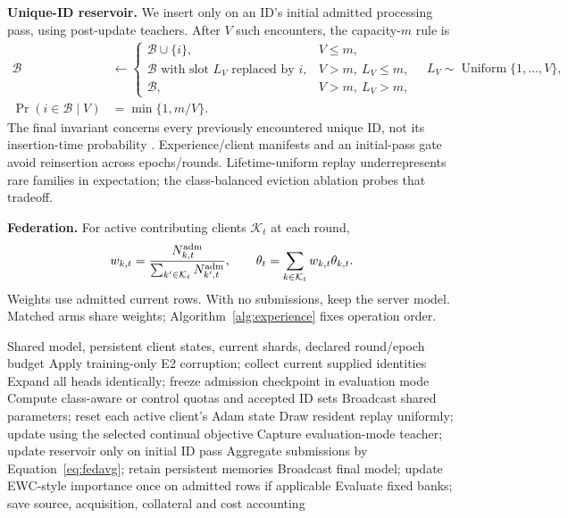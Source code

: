 \documentclass[10pt,a4paper]{article}
\begin{document}
\textbf{Unique-ID reservoir.} We insert only on an ID's initial admitted processing pass, using post-update teachers. After $V$ such encounters, the capacity-$m$ rule is
\begin{equation}
\begin{aligned}
\mathcal B&\leftarrow\begin{cases}
\mathcal B\cup\{i\},&V\le m,\\
\mathcal B\text{ with slot }L_V\text{ replaced by }i,&V>m,\ L_V\le m,\\
\mathcal B,&V>m,\ L_V>m,
\end{cases}\quad L_V\sim\operatorname{Uniform}\{1,\ldots,V\},\\
\Pr(i\in\mathcal B\mid V)&=\min\{1,m/V\}.
\end{aligned}
\label{eq:reservoir}
\end{equation}
The final invariant concerns every previously encountered unique ID, not its insertion-time probability \cite{vitter}. Experience/client manifests and an initial-pass gate avoid reinsertion across epochs/rounds. Lifetime-uniform replay underrepresents rare families in expectation; the class-balanced eviction ablation probes that tradeoff.

\textbf{Federation.} For active contributing clients $\mathcal K_t$ at each round,
\begin{equation}
w_{k,t}=\frac{N^{\rm adm}_{k,t}}{\sum_{k'\in\mathcal K_t}N^{\rm adm}_{k',t}},\qquad
\theta_t=\sum_{k\in\mathcal K_t}w_{k,t}\theta_{k,t}.
\label{eq:fedavg}
\end{equation}
Weights use admitted current rows. With no submissions, keep the server model. Matched arms share weights; Algorithm~\ref{alg:experience} fixes operation order.

\begin{algorithm}[htbp]
\caption{One proposed supervised experience}
\label{alg:experience}
\begin{algorithmic}[1]
\Require Shared model, persistent client states, current shards, declared round/epoch budget
\State Apply training-only E2 corruption; collect current supplied identities
\State Expand all heads identically; freeze admission checkpoint in evaluation mode
\State Compute class-aware or control quotas and accepted ID sets
\State Broadcast shared parameters; reset each active client's Adam state
\State Draw resident replay uniformly; update using the selected continual objective
\State Capture evaluation-mode teacher; update reservoir only on initial ID pass
\EndFor
\State Aggregate submissions by Equation~\eqref{eq:fedavg}; retain persistent memories
\EndFor
\State Broadcast final model; update EWC-style importance once on admitted rows if applicable
\State Evaluate fixed banks; save source, acquisition, collateral and cost accounting
\end{algorithmic}
\end{algorithm}
\end{document}
